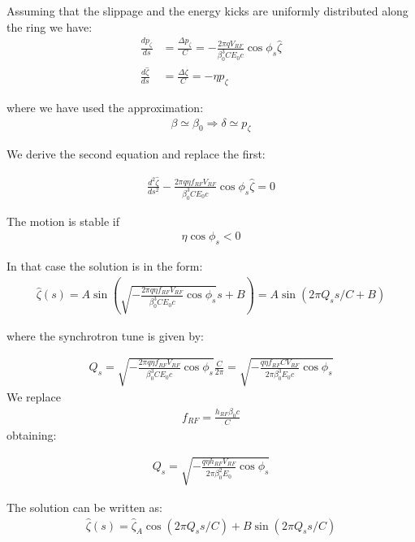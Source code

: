 Assuming that the slippage and the energy kicks are uniformly distributed along the ring we have:
\begin{align}
\frac{dp_\zeta}{d s} &= \frac{\Delta {p}_\zeta}{C}
=-\frac{2\pi q V_{RF}}{\beta_0^3 C E_0 c}\cos{\phi_s}\hat{\zeta}
\\
\frac{d\hat{\zeta}}{d s} &= \frac{\Delta \zeta}{C} = -\eta p_\zeta
\label{eg:dzeta_ds}
\end{align}

where we have used the approximation:
\begin{align}
\beta \simeq \beta_0  \Rightarrow \delta \simeq p_\zeta
\end{align}

We derive the second equation and replace the first:

\begin{align}
\frac{d^2\hat{\zeta}}{d s^2}  -  \frac{2\pi q \eta f_{RF} V_{RF}}{\beta_0^3 C E_0 c}\cos{\phi_s}\hat{\zeta} = 0
\end{align}

The motion is stable if
\begin{align}
\eta \cos{\phi_s} < 0
\end{align}

In that case the solution is in the form:
\begin{align}
\hat{\zeta}(s) = A \sin\left( \sqrt{-  \frac{2\pi q \eta f_{RF} V_{RF}}{\beta_0^3 C E_0 c}\cos{\phi_s}} s + B\right) = A \sin\left( 2 \pi Q_s s/C + B\right)
\end{align}

where the synchrotron tune is given by:


\begin{align}
Q_s = \sqrt{-  \frac{2\pi q \eta f_{RF} V_{RF}}{\beta_0^3 C E_0 c}\cos{\phi_s}} \frac{C}{2\pi}
= \sqrt{-  \frac{ q \eta f_{RF} C V_{RF}}{2\pi\beta_0^3 E_0 c}\cos{\phi_s}}
\end{align}
We replace
\begin{align}
f_{RF} = 
\frac{h_{RF} {\beta_0 c}}{C}
\end{align}
obtaining:

\begin{align}
Q_s 
= \sqrt{-  \frac{ q \eta h_{RF} V_{RF}}{2\pi\beta_0^2 E_0}\cos{\phi_s}}
\end{align}

The solution can be written as:
\begin{align}
\hat{\zeta}(s) = \hat{\zeta}_A \cos\left( 2 \pi Q_s s/C\right) + B \sin\left( 2 \pi Q_s s/C \right)
\end{align}

